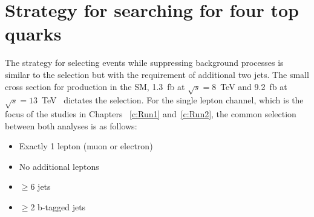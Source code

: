 

\section{Strategy for searching for four top quarks \label{sec:Strategy}}

The strategy for selecting \tttt events while suppressing background processes is similar to the \ttbar selection but with the requirement of additional two jets. The small cross section for \tttt production in the SM, 1.3~fb at $\sqrt{s}=8$~TeV and 9.2~fb at $\sqrt{s}=13$~TeV~\cite{Alwall2014,Bevilacqua2012} dictates the selection. For the single lepton channel, which is the focus of the studies in Chapters ~\ref{c:Run1} and~\ref{c:Run2}, the common selection between both analyses is as follows:

\begin{itemize}
\item Exactly 1 lepton (muon or electron)
\item No additional leptons
\item $\geq$6 jets
\item $\geq$2 b-tagged jets
\end{itemize}

